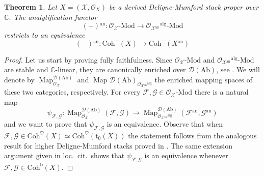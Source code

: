 \documentclass[12pt,a4paper,reqno]{amsart}
\theoremstyle{plain}
\newtheorem{thm}{Theorem}[section]
\theoremstyle{definition}
\theoremstyle{remark}
\numberwithin{equation}{section}
\begin{document}
\begin{thm} \label{thm:derived_GAGA_2}
	Let $X = ({\mathcal X}, {\mathcal O}_X)$ be a derived {Deligne-Mumford\xspace} stack proper over $\mathbb C$.
	The analytification functor
	\[ (-){^\mathrm{an}} \colon {\mathcal O}_{\mathcal X} \textrm{-} {\mathrm{Mod}} \longrightarrow {\mathcal O}_{{\mathcal X}{^\mathrm{an}}}{^\mathrm{alg}} \textrm{-} {\mathrm{Mod}} \]
	restricts to an equivalence
	\[ (-){^\mathrm{an}} \colon {\mathrm{Coh}}^-(X) \longrightarrow {\mathrm{Coh}}^-(X{^\mathrm{an}}) \]
\end{thm}

\begin{proof}
	Let us start by proving fully faithfulness.
	Since ${\mathcal O}_{\mathcal X} \textrm{-} {\mathrm{Mod}}$ and ${\mathcal O}_{{\mathcal X}{^\mathrm{an}}}{^\mathrm{alg}} \textrm{-} {\mathrm{Mod}}$ are stable and $\mathbb C$-linear, they are canonically enriched over ${{{\mathcal D}({\mathrm{Ab}})}}$, see \cite[Examples 7.4.14, 7.4.15]{Gepner_Enriched_2013}.
	We will denote by $\operatorname{Map}^{{{\mathcal D}({\mathrm{Ab}})}}_{{\mathcal O}_{\mathcal X}}$ and $\operatorname{Map}{{{\mathcal D}({\mathrm{Ab}})}}_{{\mathcal O}_{{\mathcal X}{^\mathrm{an}}}{^\mathrm{alg}}}$ the enriched mapping spaces of these two categories, respectively.
	For every ${\mathcal F}, {\mathcal G} \in {\mathcal O}_{\mathcal X} \textrm{-} {\mathrm{Mod}}$ there is a natural map
	\[ \psi_{{\mathcal F}, {\mathcal G}} \colon \operatorname{Map}^{{{\mathcal D}({\mathrm{Ab}})}}_{{\mathcal O}_{\mathcal X}}({\mathcal F}, {\mathcal G}) \to \operatorname{Map}^{{{\mathcal D}({\mathrm{Ab}})}}_{{\mathcal O}_{{\mathcal X}{^\mathrm{an}}}{^\mathrm{alg}}}({\mathcal F}{^\mathrm{an}}, {\mathcal G}{^\mathrm{an}}) \]
	and we want to prove that $\psi_{{\mathcal F}, {\mathcal G}}$ is an equivalence.
	Observe that when ${\mathcal F}, {\mathcal G} \in {\mathrm{Coh}}^\heartsuit(X) \simeq {\mathrm{Coh}}^\heartsuit({\mathrm{t}_0}(X))$ the statement follows from the analogous result for higher {Deligne-Mumford\xspace} stacks proved in \cite[Proposition 7.2]{Porta_Yu_Higher_analytic_stacks_2014}. The same extension argument given in loc.\ cit.\ shows that $\psi_{{\mathcal F}, {\mathcal G}}$ is an equivalence whenever ${\mathcal F}, {\mathcal G} \in {\mathrm{Coh}^{\mathrm{b}}}(X)$.
	

\end{proof}
\end{document}
